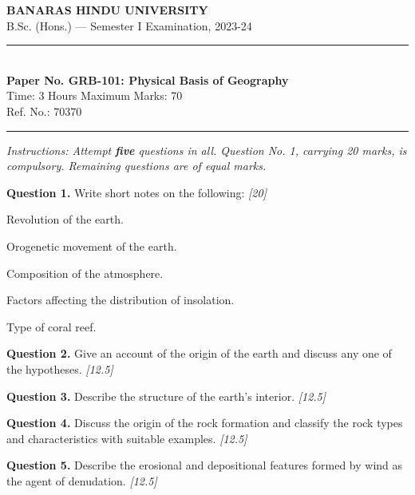\documentclass[11pt,a4paper]{article}
\newcommand{\pts}[1]{\hfill   \textit{[#1]}}
\begin{document}
\begin{center}
  {\large\bfseries BANARAS HINDU UNIVERSITY}\\[2pt]
  {\normalsize B.Sc. (Hons.) --- Semester I Examination, 2023-24}\\[6pt]
  \rule{0.8\linewidth}{0.5pt}\\[6pt]
  {\large\bfseries Paper No. GRB-101: Physical Basis of Geography}\\[4pt]
  {\normalsize Time: 3 Hours \hfill Maximum Marks: 70}\\[2pt]
  {\small Ref. No.: 70370}
\end{center}
\rule{\linewidth}{0.4pt}
\smallskip



\noindent   \textit{Instructions: Attempt   \textbf{five} questions in all. Question No. 1, carrying 20 marks, is compulsory. Remaining questions are of equal marks.}
\bigskip




\noindent   \textbf{Question 1.} Write short notes on the following: \pts{20}

\begin{parts}
  \item Revolution of the earth.
  \item Orogenetic movement of the earth.
  \item Composition of the atmosphere.
  \item Factors affecting the distribution of insolation.
  \item Type of coral reef.
\end{parts}

\medskip


\noindent   \textbf{Question 2.} Give an account of the origin of the earth and discuss any one of the hypotheses. \pts{12.5}

\medskip


\noindent   \textbf{Question 3.} Describe the structure of the earth's interior. \pts{12.5}

\medskip


\noindent   \textbf{Question 4.} Discuss the origin of the rock formation and classify the rock types and characteristics with suitable examples. \pts{12.5}

\medskip


\noindent   \textbf{Question 5.} Describe the erosional and depositional features formed by wind as the agent of denudation. \pts{12.5}

\medskip
\end{document}
